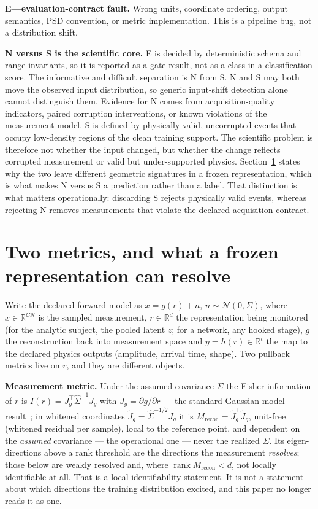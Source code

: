 \documentclass[10pt,twocolumn]{extarticle}
\begin{document}
\textbf{E---evaluation-contract fault.} Wrong units, coordinate ordering,
output semantics, PSD convention, or metric implementation. This is a pipeline
bug, not a distribution shift.

\textbf{N versus S is the scientific core.} E is decided by deterministic
schema and range invariants, so it is reported as a gate result, not as a class
in a classification score. The informative and difficult separation is N from
S. N and S may both move the observed input distribution, so generic
input-shift detection alone cannot distinguish them. Evidence for N comes from
acquisition-quality indicators, paired corruption interventions, or known
violations of the measurement model. S is defined by physically valid,
uncorrupted events that occupy low-density regions of the clean training
support. The scientific problem is therefore not whether the input changed, but
whether the change reflects corrupted measurement or valid but under-supported
physics. Section~\ref{sec:mechanism} states why the two leave different
geometric signatures in a frozen representation, which is what makes N versus
S a prediction rather than a label. That distinction is what matters operationally: discarding S rejects
physically valid events, whereas rejecting N removes measurements that violate
the declared acquisition contract.

\section{Two metrics, and what a frozen representation can resolve}
\label{sec:mechanism}

Write the declared forward model as $x=g(r)+n$, $n\sim\mathcal N(0,\Sigma)$,
where $x\in\mathbb R^{CN}$ is the sampled measurement, $r\in\mathbb R^{d}$ the
representation being monitored (for the analytic subject, the pooled latent
$z$; for a network, any hooked stage), $g$ the reconstruction back into
measurement space and $y=h(r)\in\mathbb R^{t}$ the map to the declared physics
outputs (amplitude, arrival time, shape). Two pullback metrics live on $r$, and
they are different objects.

\textbf{Measurement metric.} Under the assumed covariance $\hat\Sigma$ the
Fisher information of $r$ is $I(r)=J_g^{\top}\hat\Sigma^{-1}J_g$ with
$J_g=\partial g/\partial r$ --- the standard Gaussian-model
result~\cite{kay1993}; in whitened coordinates
$\tilde J_g=\hat\Sigma^{-1/2}J_g$ it is $M_{\mathrm{recon}}=\tilde
J_g^{\top}\tilde J_g$, unit-free (whitened residual per sample), local to the
reference point, and dependent on the \emph{assumed} covariance --- the
operational one --- never the realized $\Sigma$. Its eigen-directions above a
rank threshold are the directions the measurement \emph{resolves}; those below
are weakly resolved and, where $\operatorname{rank}M_{\mathrm{recon}}<d$, not
locally identifiable at all. That is a local identifiability statement. It is
not a statement about which directions the training distribution excited, and
this paper no longer reads it as one.
\end{document}
